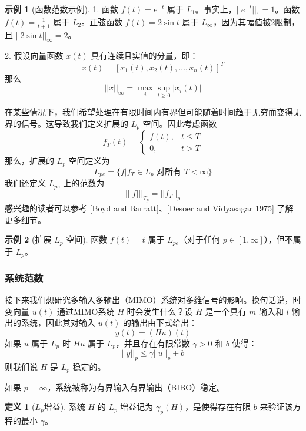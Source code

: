 \documentclass[UTF8,12pt,a4paper]{ctexart}
\theoremstyle{definition}
\newtheorem{definition}{定义}[section]
\newtheorem{example}{示例}[section]
\begin{document}
\begin{example}[函数范数示例]

1. 函数 $f(t)=e^{-t}$ 属于 $L_1$。事实上，$||e^{-t}||_1=1$。函数 $f(t)=\frac{1}{t+1}$ 属于 $L_2$。正弦函数 $f(t)=2\sin t$ 属于 $L_\infty$，因为其幅值被2限制，且 $||2\sin t||_\infty=2$。

2. 假设向量函数 $x(t)$ 具有连续且实值的分量，即：
\[
x(t) = [x_1(t), x_2(t), \ldots, x_n(t)]^T
\]
那么
\[
||x||_\infty = \max_i \sup_{t \geq 0} |x_i(t)|
\]
\end{example}

在某些情况下，我们希望处理在有限时间内有界但可能随着时间趋于无穷而变得无界的信号。这导致我们定义扩展的 $L_p$ 空间。因此考虑函数
\begin{equation}\label{eq:2.5.1}
f_T(t) = \begin{cases} f(t), & t \leq T \\ 0, & t > T \end{cases}
\end{equation}
那么，扩展的 $L_p$ 空间定义为
\[
L_{pe} = \{f | f_T \in L_p \text{ 对所有 } T < \infty\}
\]
我们还定义 $L_{pe}$ 上的范数为
\begin{equation}\label{eq:2.5.2}
|||f|||_{T_p} = ||f_T||_p
\end{equation}
感兴趣的读者可以参考 [Boyd and Barratt]、[Desoer and Vidyasagar 1975] 了解更多细节。

\begin{example}[扩展 $L_p$ 空间]
函数 $f(t)=t$ 属于 $L_{pe}$（对于任何 $p \in [1, \infty]$），但不属于 $L_p$。
\end{example}

\subsubsection{系统范数}

接下来我们想研究多输入多输出（MIMO）系统对多维信号的影响。换句话说，时变向量 $u(t)$ 通过MIMO系统 $H$ 时会发生什么？设 $H$ 是一个具有 $m$ 输入和 $l$ 输出的系统，因此其对输入 $u(t)$ 的输出由下式给出：
\[
y(t) = (Hu)(t)
\]
如果 $u$ 属于 $L_p$ 时 $Hu$ 属于 $L_p$，并且存在有限常数 $\gamma > 0$ 和 $b$ 使得：
\[
||y||_p \leq \gamma ||u||_p + b
\]
则我们说 $H$ 是 $L_p$ 稳定的。

如果 $p=\infty$，系统被称为有界输入有界输出（BIBO）稳定。

\begin{definition}[$L_p$增益]
系统 $H$ 的 $L_p$ 增益记为 $\gamma_p(H)$，是使得存在有限 $b$ 来验证该方程的最小 $\gamma$。
\end{definition}
\end{document}
